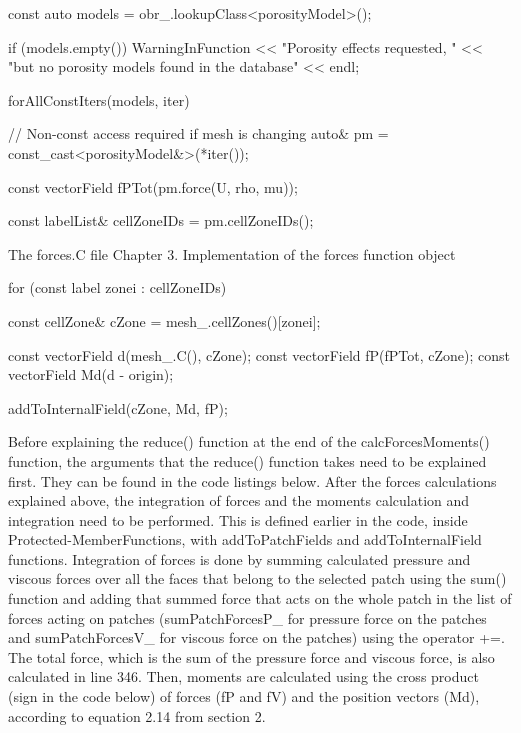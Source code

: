 {{const auto models = obr\_.lookupClass<porosityModel>();

if (models.empty())
{
WarningInFunction
<< "Porosity effects requested, "
<< "but no porosity models found in the database"
<< endl;
}

forAllConstIters(models, iter)
{
// Non-const access required if mesh is changing
auto\& pm = const\_cast<porosityModel\&>(*iter());

const vectorField fPTot(pm.force(U, rho, mu));

const labelList\& cellZoneIDs = pm.cellZoneIDs();

 The forces.C file Chapter 3. Implementation of the forces function object

for (const label zonei : cellZoneIDs)
{
const cellZone\& cZone = mesh\_.cellZones()[zonei];

const vectorField d(mesh\_.C(), cZone);
const vectorField fP(fPTot, cZone);
const vectorField Md(d - origin);

addToInternalField(cZone, Md, fP);
}

Before explaining the reduce() function at the end of the calcForcesMoments() function, the arguments that the reduce() function takes need to be explained first. They can be found in the code listings below. After the forces calculations explained above, the integration of forces and the moments calculation and integration need to be performed. This is defined earlier in the code, inside Protected-MemberFunctions, with addToPatchFields and addToInternalField functions. Integration of forces is done by summing calculated pressure and viscous forces over all the faces that belong to the selected patch using the sum() function and adding that summed force that acts on the whole patch in the list of forces acting on patches (sumPatchForcesP\_ for pressure force on the patches and sumPatchForcesV\_ for viscous force on the patches) using the operator +=. The total force, which is the sum of the pressure force and viscous force, is also calculated in line 346. Then, moments are calculated using the cross product (sign in the code below) of forces (fP and fV) and the position vectors (Md), according to equation 2.14 from section 2.

}}}

